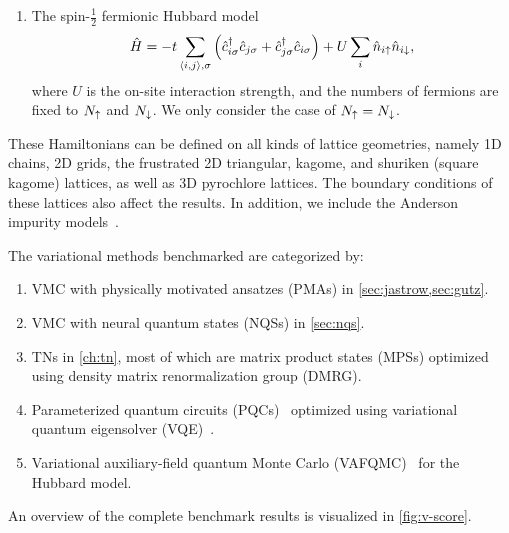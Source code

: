 \begin{enumerate}
\item The spin-$\frac{1}{2}$ fermionic Hubbard model
\begin{equation}
\hat{H} = -t \sum_{\langle i, j \rangle, \sigma} \left( \hat{c}^\dagger_{i \sigma} \hat{c}_{j \sigma} + \hat{c}^\dagger_{j \sigma} \hat{c}_{i \sigma} \right)
+ U \sum_i \hat{n}_{i {\uparrow}} \hat{n}_{i {\downarrow}},
\end{equation}
where $U$ is the on-site interaction strength, and the numbers of fermions are fixed to $N_{\uparrow}$ and $N_{\downarrow}$. We only consider the case of $N_{\uparrow} = N_{\downarrow}$.
\end{enumerate}
These Hamiltonians can be defined on all kinds of lattice geometries, namely 1D chains, 2D grids, the frustrated 2D triangular, kagome, and shuriken (square kagome) lattices, as well as 3D pyrochlore lattices. The boundary conditions of these lattices also affect the results. In addition, we include the Anderson impurity models~\cite{anderson1961localized, kanamori1963electron, kondo1964resistance, lu2019natural, cao2021tree, cao2024vision}.

The variational methods benchmarked are categorized by:
\begin{enumerate}
\item VMC with physically motivated ansatzes (PMAs) in \cref{sec:jastrow,sec:gutz}.
\item VMC with neural quantum states (NQSs) in \cref{sec:nqs}.
\item TNs in \cref{ch:tn}, most of which are matrix product states (MPSs) optimized using density matrix renormalization group (DMRG).
\item Parameterized quantum circuits (PQCs)~\cite{cerezo2021variational, wecker2015progress} optimized using variational quantum eigensolver (VQE)~\cite{peruzzo2014variational, seki2020symmetry, astrakhantsev2023phenomenological}.
\item Variational auxiliary-field quantum Monte Carlo (VAFQMC)~\cite{sorella2021phase} for the Hubbard model.
\end{enumerate}

An overview of the complete benchmark results is visualized in \cref{fig:v-score}.

\newpage

